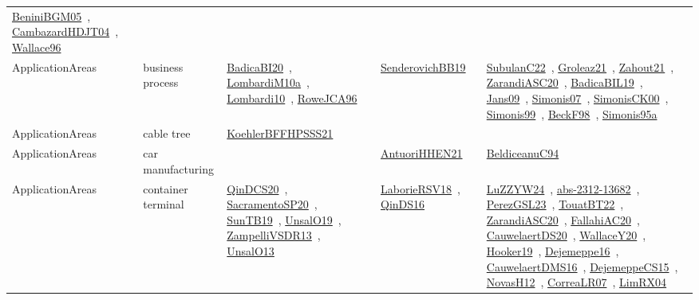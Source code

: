{\begin{longtable}{lp{3cm}>{\raggedright\arraybackslash}p{6cm}>{\raggedright\arraybackslash}p{6cm}>{\raggedright\arraybackslash}p{8cm}}
\href{../works/BeniniBGM05.pdf}{BeniniBGM05}~\cite{BeniniBGM05}, \href{../works/CambazardHDJT04.pdf}{CambazardHDJT04}~\cite{CambazardHDJT04}, \href{../works/Wallace96.pdf}{Wallace96}~\cite{Wallace96}\\
ApplicationAreas & business process & \href{../works/BadicaBI20.pdf}{BadicaBI20}~\cite{BadicaBI20}, \href{../works/LombardiM10a.pdf}{LombardiM10a}~\cite{LombardiM10a}, \href{../works/Lombardi10.pdf}{Lombardi10}~\cite{Lombardi10}, \href{../works/RoweJCA96.pdf}{RoweJCA96}~\cite{RoweJCA96} & \href{../works/SenderovichBB19.pdf}{SenderovichBB19}~\cite{SenderovichBB19} & \href{../works/SubulanC22.pdf}{SubulanC22}~\cite{SubulanC22}, \href{../works/Groleaz21.pdf}{Groleaz21}~\cite{Groleaz21}, \href{../works/Zahout21.pdf}{Zahout21}~\cite{Zahout21}, \href{../works/ZarandiASC20.pdf}{ZarandiASC20}~\cite{ZarandiASC20}, \href{../works/BadicaBIL19.pdf}{BadicaBIL19}~\cite{BadicaBIL19}, \href{../works/Jans09.pdf}{Jans09}~\cite{Jans09}, \href{../works/Simonis07.pdf}{Simonis07}~\cite{Simonis07}, \href{../works/SimonisCK00.pdf}{SimonisCK00}~\cite{SimonisCK00}, \href{../works/Simonis99.pdf}{Simonis99}~\cite{Simonis99}, \href{../works/BeckF98.pdf}{BeckF98}~\cite{BeckF98}, \href{../works/Simonis95a.pdf}{Simonis95a}~\cite{Simonis95a}\\
ApplicationAreas & cable tree & \href{../works/KoehlerBFFHPSSS21.pdf}{KoehlerBFFHPSSS21}~\cite{KoehlerBFFHPSSS21} &  & \\
ApplicationAreas & car manufacturing &  & \href{../works/AntuoriHHEN21.pdf}{AntuoriHHEN21}~\cite{AntuoriHHEN21} & \href{../works/BeldiceanuC94.pdf}{BeldiceanuC94}~\cite{BeldiceanuC94}\\
ApplicationAreas & container terminal & \href{../works/QinDCS20.pdf}{QinDCS20}~\cite{QinDCS20}, \href{../works/SacramentoSP20.pdf}{SacramentoSP20}~\cite{SacramentoSP20}, \href{../works/SunTB19.pdf}{SunTB19}~\cite{SunTB19}, \href{../works/UnsalO19.pdf}{UnsalO19}~\cite{UnsalO19}, \href{../works/ZampelliVSDR13.pdf}{ZampelliVSDR13}~\cite{ZampelliVSDR13}, \href{../works/UnsalO13.pdf}{UnsalO13}~\cite{UnsalO13} & \href{../works/LaborieRSV18.pdf}{LaborieRSV18}~\cite{LaborieRSV18}, \href{../works/QinDS16.pdf}{QinDS16}~\cite{QinDS16} & \href{../works/LuZZYW24.pdf}{LuZZYW24}~\cite{LuZZYW24}, \href{../works/abs-2312-13682.pdf}{abs-2312-13682}~\cite{abs-2312-13682}, \href{../works/PerezGSL23.pdf}{PerezGSL23}~\cite{PerezGSL23}, \href{../works/TouatBT22.pdf}{TouatBT22}~\cite{TouatBT22}, \href{../works/ZarandiASC20.pdf}{ZarandiASC20}~\cite{ZarandiASC20}, \href{../works/FallahiAC20.pdf}{FallahiAC20}~\cite{FallahiAC20}, \href{../works/CauwelaertDS20.pdf}{CauwelaertDS20}~\cite{CauwelaertDS20}, \href{../works/WallaceY20.pdf}{WallaceY20}~\cite{WallaceY20}, \href{../works/Hooker19.pdf}{Hooker19}~\cite{Hooker19}, \href{../works/Dejemeppe16.pdf}{Dejemeppe16}~\cite{Dejemeppe16}, \href{../works/CauwelaertDMS16.pdf}{CauwelaertDMS16}~\cite{CauwelaertDMS16}, \href{../works/DejemeppeCS15.pdf}{DejemeppeCS15}~\cite{DejemeppeCS15}, \href{../works/NovasH12.pdf}{NovasH12}~\cite{NovasH12}, \href{../works/CorreaLR07.pdf}{CorreaLR07}~\cite{CorreaLR07}, \href{../works/LimRX04.pdf}{LimRX04}~\cite{LimRX04}\\

\end{longtable}}
